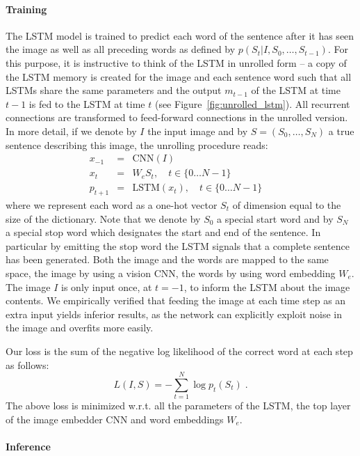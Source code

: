 \paragraph{Training} The LSTM model is trained to predict each word of the
sentence after it has seen the image as well as all preceding words as defined by
$p(S_t | I, S_0, \ldots, S_{t-1})$. For this purpose, it is instructive to think
of the LSTM in unrolled form -- a copy of the LSTM memory is created for the
image and each sentence word such that all LSTMs share the same parameters and the
output $m_{t-1}$ of the LSTM at time $t-1$ is fed to the LSTM at time $t$ (see
Figure~\ref{fig:unrolled_lstm}). All recurrent connections are transformed to feed-forward connections in the 
unrolled version. In more detail, if we denote by $I$ the input
image and by $S=(S_0,\ldots, S_N)$ a true sentence describing this image, the
unrolling procedure reads:
\begin{eqnarray}
x_{-1} &=& \textrm{CNN}(I)\\
x_t &=& W_e S_t, \quad t\in\{0\ldots N-1\}\quad \label{eqn:sparse}\\
p_{t+1} &=& \textrm{LSTM}(x_t), \quad t\in\{0\ldots N-1\}\quad
\end{eqnarray}
where we represent each word as a one-hot vector $S_t$ of dimension equal to the
size of the dictionary. Note that we denote by $S_0$ a special start word and by
$S_{N}$ a special stop word which designates the start and end of the sentence.
In particular by emitting the stop word the LSTM signals that a complete sentence
has been generated. Both the image and the words are mapped to the same space,
the image by using a vision CNN, the words by using word embedding $W_e$. The image
$I$ is only input once, at $t=-1$, to inform the LSTM about the image contents. We
empirically verified that feeding the image at each time step as an extra input yields
inferior results, as the network can explicitly exploit noise in the image and
overfits more easily.

Our loss is the sum of the negative log likelihood of the correct word at each step as follows:
\begin{equation}
L(I, S) = - \sum_{t=1}^N \log p_t(S_t) \; .
\end{equation}
The above loss is minimized w.r.t. all the parameters of the LSTM, the top layer of the
image embedder CNN and word embeddings $W_e$.

\paragraph{Inference}

